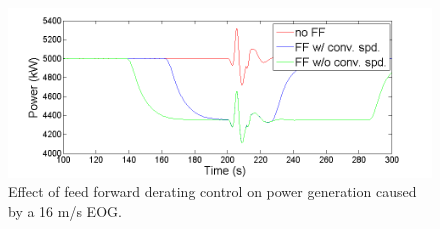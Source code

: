 \begin{figure}[htb]
	\centering
		\includegraphics[width = \linewidth]{Figures/ch4Figures/fig4-26.png}
		
	\caption{Effect of feed forward derating control on power generation caused by a 16 m/s EOG.}
	\label{fig4-26}
\end{figure}


